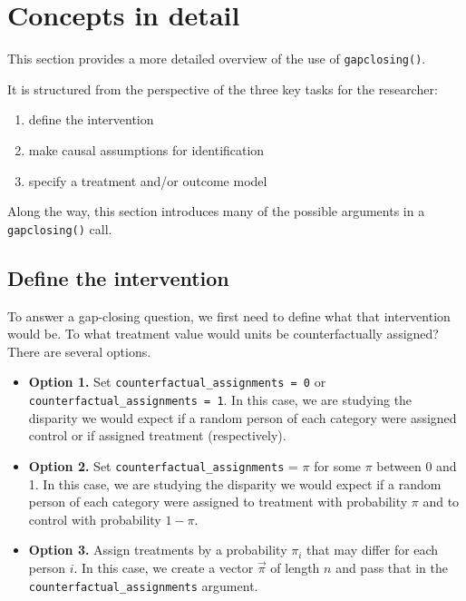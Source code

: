 \documentclass[
]{article}
\providecommand{\tightlist}{%
  \setlength{\itemsep}{0pt}\setlength{\parskip}{0pt}}
\begin{document}
\section{Concepts in detail}\label{concepts-in-detail}

This section provides a more detailed overview of the use of \texttt{gapclosing()}.

It is structured from the perspective of the three key tasks for the researcher:

\begin{enumerate}
\def\labelenumi{\arabic{enumi}.}
\tightlist
\item
  define the intervention
\item
  make causal assumptions for identification
\item
  specify a treatment and/or outcome model
\end{enumerate}

Along the way, this section introduces many of the possible arguments in a \texttt{gapclosing()} call.

\subsection{Define the intervention}\label{define-the-intervention}

To answer a gap-closing question, we first need to define what that intervention would be. To what treatment value would units be counterfactually assigned? There are several options.

\begin{itemize}
\tightlist
\item
  \textbf{Option 1.} Set \texttt{counterfactual\_assignments\ =\ 0} or \texttt{counterfactual\_assignments\ =\ 1}. In this case, we are studying the disparity we would expect if a random person of each category were assigned control or if assigned treatment (respectively).
\item
  \textbf{Option 2.} Set \texttt{counterfactual\_assignments} = \(\pi\) for some \(\pi\) between 0 and 1. In this case, we are studying the disparity we would expect if a random person of each category were assigned to treatment with probability \(\pi\) and to control with probability \(1 - \pi\).
\item
  \textbf{Option 3.} Assign treatments by a probability \(\pi_i\) that may differ for each person \(i\). In this case, we create a vector \(\vec\pi\) of length \(n\) and pass that in the \texttt{counterfactual\_assignments} argument.
\end{itemize}
\end{document}
